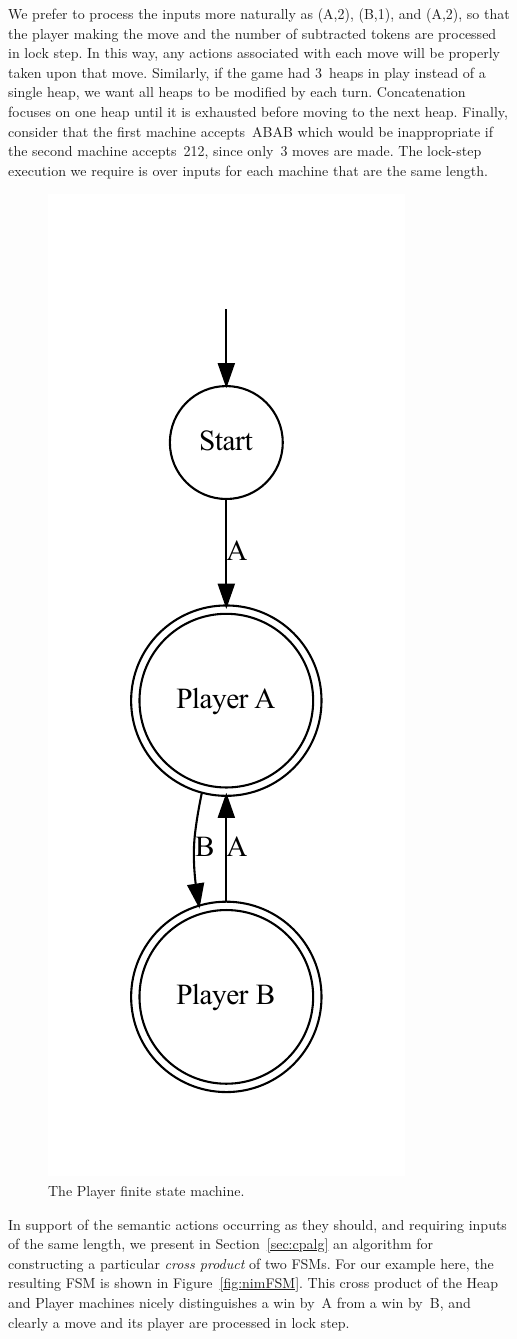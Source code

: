 \documentclass[sigplan,anonymous,review]{acmart}
\begin{document}
We prefer to process the inputs more naturally as (A,2), (B,1), and (A,2), so that the player making the move and the number of subtracted tokens are processed in lock step.  In this way, any actions associated with each move will be properly taken upon that move.  Similarly, if the game had 3~heaps in play instead of a single heap, we want all heaps to be modified by each turn.  Concatenation focuses on one heap until it is exhausted before moving to the next heap.   Finally, consider that the first machine accepts~ABAB which would be inappropriate if the second machine accepts~212, since only~3 moves are made.  The lock-step execution we require is over inputs for each machine that are the same length.

\begin{figure}
    \centering
    \includegraphics[width=0.35\linewidth]{figures/nimexample/playerFSM.pdf}
    \caption{The Player finite state machine.}
    \label{fig:nimPlayerFSM}
\end{figure}

In support of the semantic actions occurring as they should, and requiring inputs of the same length, we present in Section~\ref{sec:cpalg} an algorithm for constructing a particular \emph{cross product} of two FSMs.  For our example here, the resulting FSM is shown in Figure~\ref{fig:nimFSM}.  This cross product of the Heap and Player machines nicely distinguishes a win by~A from a win by~B, and clearly a move and its player are processed in lock step.
\end{document}
